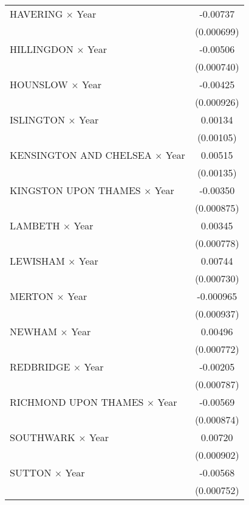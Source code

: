 {\begin{longtable}{l*{1}{c}}
\addlinespace
HAVERING $\times$ Year&    -0.00737\sym{***}\\
                    &  (0.000699)         \\
\addlinespace
HILLINGDON $\times$ Year&    -0.00506\sym{***}\\
                    &  (0.000740)         \\
\addlinespace
HOUNSLOW $\times$ Year&    -0.00425\sym{***}\\
                    &  (0.000926)         \\
\addlinespace
ISLINGTON $\times$ Year&     0.00134         \\
                    &   (0.00105)         \\
\addlinespace
KENSINGTON AND CHELSEA $\times$ Year&     0.00515\sym{***}\\
                    &   (0.00135)         \\
\addlinespace
KINGSTON UPON THAMES $\times$ Year&    -0.00350\sym{***}\\
                    &  (0.000875)         \\
\addlinespace
LAMBETH $\times$ Year&     0.00345\sym{***}\\
                    &  (0.000778)         \\
\addlinespace
LEWISHAM $\times$ Year&     0.00744\sym{***}\\
                    &  (0.000730)         \\
\addlinespace
MERTON $\times$ Year&   -0.000965         \\
                    &  (0.000937)         \\
\addlinespace
NEWHAM $\times$ Year&     0.00496\sym{***}\\
                    &  (0.000772)         \\
\addlinespace
REDBRIDGE $\times$ Year&    -0.00205\sym{**} \\
                    &  (0.000787)         \\
\addlinespace
RICHMOND UPON THAMES $\times$ Year&    -0.00569\sym{***}\\
                    &  (0.000874)         \\
\addlinespace
SOUTHWARK $\times$ Year&     0.00720\sym{***}\\
                    &  (0.000902)         \\
\addlinespace
SUTTON $\times$ Year&    -0.00568\sym{***}\\
                    &  (0.000752)         \\

\end{longtable}}
